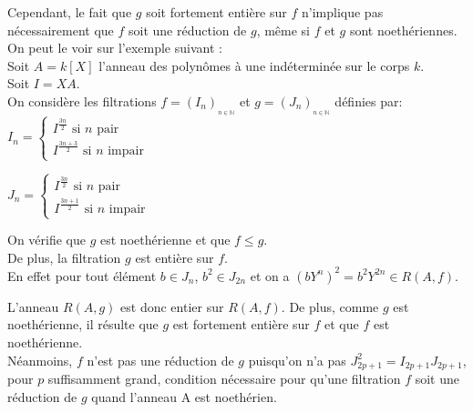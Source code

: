 \begin{maremarque}
	Cependant, le fait que $g$ soit fortement entière sur $f$ n'implique pas
	nécessairement que $f$ soit une réduction de $g$, même si $f$ et 
	$g$ sont noethériennes. On peut le voir sur l'exemple suivant :\\ 
	Soit $A=k[X]$ l'anneau des polynômes à une indéterminée sur le
	corps $k$. \\ Soit $I=XA$.\\
	On considère les filtrations $f=(I_{n})_{_{n\in \mathbb{N}}}$ et $g=(J_{n})_{_{n\in \mathbb{N}}}$ définies par:\\
	$I_{n}=\left\{ 
	\begin{array}{c}
		I^{\frac{3n}{2}}\text{ si }n\text{ pair} \\ 
		I^{\frac{3n+3}{2}}\text{ si }n\text{ impair}
	\end{array}
	\right. $
	
	$J_{n}=\left\{ 
	\begin{array}{c}
		I^{\frac{3n}{2}}\text{ si }n\text{ pair} \\ 
		I^{\frac{3n+1}{2}}\text{ si }n\text{ impair}
	\end{array}
	\right. $
	
	On vérifie que $g$ est noethérienne et que $f\leq g$. \\ De plus, la filtration $g$ est entière sur $f$.\\ En effet pour tout élément $b\in J_{n}$, $b^{2}\in J_{2n}$ et on a $(bY^{n})^{2}=b^{2}Y^{2n}\in R(A,f)$. 
	
	L'anneau $R(A,g)$ est donc entier sur $R(A,f)$. De plus, comme $g$ est noethérienne, il résulte que $g$ est fortement entière sur $f$ et que $f$ est noethérienne.\\
	Néanmoins, $f$ n'est pas une réduction de $g$ puisqu'on n'a pas $J_{2p+1}^{2}=I_{2p+1}J_{2p+1}$, pour $p$ suffisamment grand, condition nécessaire pour qu'une filtration $f$ soit une réduction de $g$ quand
	l'anneau A est noethérien. 
\end{maremarque}
